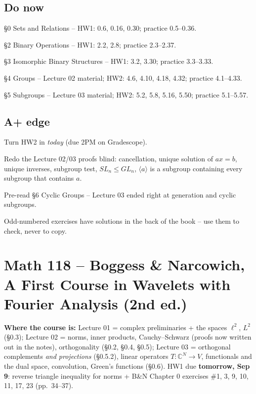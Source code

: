 \documentclass[11pt]{article}
\begin{document}
\subsection*{Do now}
\begin{todo}
  \item \S0 Sets and Relations -- HW1: 0.6, 0.16, 0.30; practice 0.5--0.36.
  \item \S2 Binary Operations -- HW1: 2.2, 2.8; practice 2.3--2.37.
  \item \S3 Isomorphic Binary Structures -- HW1: 3.2, 3.30; practice 3.3--3.33.
  \item \S4 Groups -- Lecture 02 material; HW2: 4.6, 4.10, 4.18, 4.32; practice
    4.1--4.33.
  \item \S5 Subgroups -- Lecture 03 material; HW2: 5.2, 5.8, 5.16, 5.50;
    practice 5.1--5.57.
\end{todo}

\subsection*{A+ edge}
\begin{todo}
  \item Turn HW2 in \emph{today} (due 2PM on Gradescope).
  \item Redo the Lecture 02/03 proofs blind: cancellation, unique solution of
    $ax = b$, unique inverses, subgroup test, $SL_n \le GL_n$, $\langle a
    \rangle$ is a subgroup containing every subgroup that contains $a$.
  \item Pre-read \S6 Cyclic Groups -- Lecture 03 ended right at generation and
    cyclic subgroups.
  \item Odd-numbered exercises have solutions in the back of the book -- use
    them to check, never to copy.
\end{todo}

\section*{Math 118 -- Boggess \& Narcowich, A First Course in Wavelets with
Fourier Analysis (2nd ed.)}
\textbf{Where the course is:} Lecture 01 = complex preliminaries + the spaces
$\ell^2$, $L^2$ (\S0.3); Lecture 02 = norms, inner products, Cauchy--Schwarz
(proofs now written out in the notes), orthogonality (\S0.2, \S0.4, \S0.5);
Lecture 03 = orthogonal complements \emph{and projections} (\S0.5.2), linear
operators $T : \mathbb{C}^N \to V$, functionals and the dual space, convolution,
Green's functions (\S0.6). HW1 due \textbf{tomorrow, Sep 9}: reverse triangle
inequality for norms + B\&N Chapter 0 exercises \#1, 3, 9, 10, 11, 17, 23
(pp.~34--37).
\end{document}
